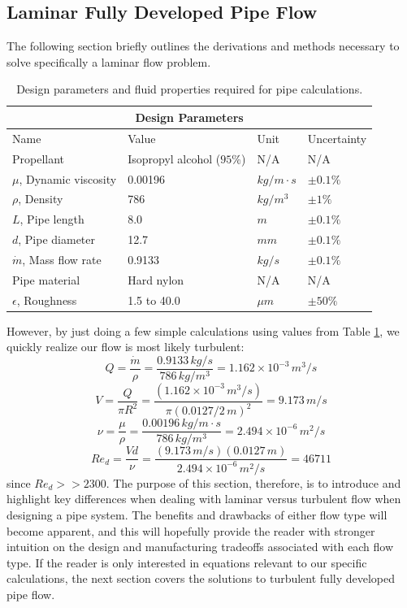 \documentclass[11pt]{article} %
\numberwithin{equation}{section} %
\begin{document}
\subsection{Laminar Fully Developed Pipe Flow}
The following section briefly outlines the derivations and methods necessary to solve specifically a laminar flow problem. 

\begin{table}[!htb]
\centering
\begin{tabular}{ |p{4cm}||p{4cm}|p{2cm}|p{2cm}|  }
\hline
\multicolumn{4}{|c|}{Design Parameters} \\
\hline
Name & Value & Unit & Uncertainty \\
\hline
Propellant  &  Isopropyl alcohol ($95\%$)   &  N/A  &  N/A \\
$\mu$, Dynamic viscosity  &  0.00196  &  $kg/m \cdot s$  &  $\pm 0.1 \%$ \\
$\rho$, Density  &  786  &  $kg/m^{3}$  &  $\pm 1 \%$ \\
$L$, Pipe length  &  8.0  &  $m$  &  $\pm 0.1 \%$  \\
$d$, Pipe diameter  &  12.7  &  $mm$  &   $\pm 0.1 \%$ \\
$\dot{m}$, Mass flow rate  &  0.9133  &  $kg/s$  &   $\pm 0.1 \%$ \\
Pipe material  &  Hard nylon  &  N/A  &  N/A \\
$\epsilon$, Roughness  &  1.5 to 40.0  &  $\mu m$  &  $\pm 50 \%$ \\
\hline
\end{tabular}
\caption{Design parameters and fluid properties required for pipe calculations.}
\label{table:parameters}
\end{table}
However, by just doing a few simple calculations using values from Table \ref{table:parameters}, we quickly realize our flow is most likely turbulent:
\begin{equation}
Q = \frac{\dot{m}}{\rho} = \frac{0.9133\, kg/s}{786\, kg/m^{3}} = 1.162 \times 10^{-3}\, m^{3}/s
\end{equation}
\begin{equation}
V = \frac{Q}{\pi R^{2}} = \frac{(1.162 \times 10^{-3}\, m^{3}/s)}{\pi (0.0127 / 2\, m)^{2}} = 9.173\, m/s
\end{equation}
\begin{equation}
\nu = \frac{\mu}{\rho} = \frac{0.00196\, kg/m \cdot s}{786\, kg/m^{3}} = 2.494 \times 10^{-6}\, m^{2}/s
\end{equation}
\begin{equation}
Re_{d} = \frac{V d}{\nu} = \frac{(9.173\, m/s)(0.0127\, m)}{2.494 \times 10^{-6}\, m^{2}/s} = 46711
\end{equation}
since $Re_{d} >> 2300$. The purpose of this section, therefore, is to introduce and highlight key differences when dealing with laminar versus turbulent flow when designing a pipe system. The benefits and drawbacks of either flow type will become apparent, and this will hopefully provide the reader with stronger intuition on the design and manufacturing tradeoffs associated with each flow type. If the reader is only interested in equations relevant to our specific calculations, the next section covers the solutions to turbulent fully developed pipe flow.
\end{document}
